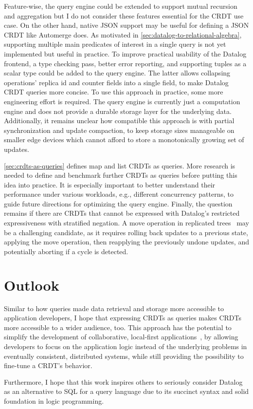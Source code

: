 Feature-wise, the query engine could be extended to support mutual recursion
and aggregation but I do not consider these features essential for the
\ac{CRDT} use case. On the other hand, native JSON support may be useful for
defining a JSON \ac{CRDT} like Automerge does.
As motivated in \ref{sec:datalog-to-relational-algebra}, supporting multiple
main predicates of interest in a single query is not yet implemented but useful
in practice.
To improve practical usability of the Datalog frontend,
a type checking pass, better error reporting, and supporting tuples as a scalar
type could be added to the query engine.
The latter allows collapsing operations' replica id and counter fields
into a single field, to make Datalog \ac{CRDT} queries more concise.
To use this approach in practice, some more engineering effort is required.
The query engine is currently just a computation engine and does not provide
a durable storage layer for the underlying data.
Additionally, it remains unclear how compatible this approach is with
partial synchronization and update compaction, to keep storage sizes manageable
on smaller edge devices which cannot afford to store a monotonically growing
set of updates.

\ref{sec:crdts-as-queries} defines map and list \acp{CRDT} as queries.
More research is needed to define and benchmark further \acp{CRDT} as queries
before putting this idea into practice.
It is especially important to better understand their performance under various
workloads, e.g., different concurrency patterns, to guide future directions for
optimizing the query engine.
Finally, the question remains if there are \acp{CRDT} that cannot be expressed
with Datalog's restricted expressiveness with stratified negation.
A move operation in replicated trees~\cite{moveop1,moveop2} may be a challenging
candidate, as it requires rolling back updates to a previous state,
applying the move operation, then reapplying the previously undone updates,
and potentially aborting if a cycle is detected.

\section{Outlook}\label{sec:outlook}

Similar to how queries made data retrieval and storage more accessible to
application developers, I hope that expressing \acp{CRDT} as queries
makes \acp{CRDT} more accessible to a wider audience, too.
This approach has the potential to simplify the development of
collaborative, local-first applications~\cite{kleppmann2019local},
by allowing developers to focus on the application logic instead of the
underlying problems in eventually consistent, distributed systems, while
still providing the possibility to fine-tune a \ac{CRDT}'s behavior.

Furthermore, I hope that this work inspires others to seriously consider Datalog
as an alternative to SQL for a query language due to its succinct syntax
and solid foundation in logic programming.
